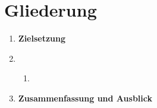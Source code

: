 \section{Gliederung}

\begin{enumerate}
	\item \textbf{Zielsetzung} 
    \item \
    	\begin{enumerate}
    	\item 
    	\end{enumerate}
     \item \textbf{Zusammenfassung und Ausblick}
\end{enumerate}